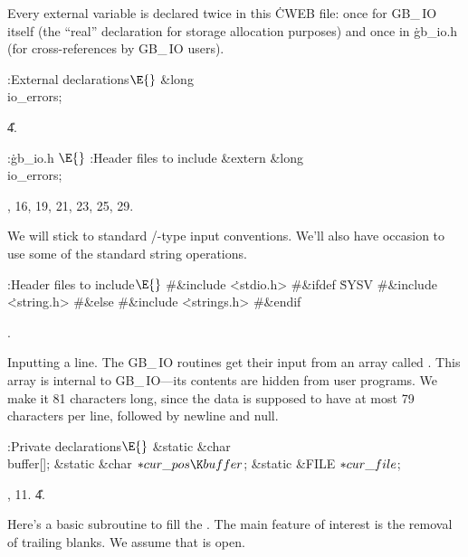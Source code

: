 Every external variable is declared twice in this \.{CWEB} file:
once for {\sc GB\_\,IO} itself (the ``real'' declaration for storage
allocation purposes) and once in \.{gb\_io.h} (for cross-references
by {\sc GB\_\,IO} users).

\Y\B\4:External declarations\X${}\E{}$\6
\&{long} \\{io\_errors};\par
\U4.\fi

\B{}:\.{gb\_io.h }\X${}\E{}$\6
:Header files to include\X\7
\&{extern} \&{long} \\{io\_errors};\par
{}, 16, 19, 21, 23, 25, 29.\fi

We will stick to standard \CEE/-type input conventions. We'll also have
occasion to use some of the standard string operations.

\Y\B\4:Header files to include\X${}\E{}$\6
\8\#\&{include} \.{<stdio.h>}\6
\8\#\&{ifdef} \.{SYSV}\6
\8\#\&{include} \.{<string.h>}\6
\8\#\&{else}\6
\8\#\&{include} \.{<strings.h>}\6
\8\#\&{endif}\par
{}.\fi

Inputting a line. The {\sc GB\_\,IO} routines get their input from
an array called . This array is internal to {\sc
GB\_\,IO}---its contents are hidden from user programs. We make it 81
characters long, since the data is supposed to have at most 79
characters per line, followed by newline and null.

\Y\B\4:Private declarations\X${}\E{}$\6
\&{static} \&{char} \\{buffer}[];\6
\&{static} \&{char} ${}{*}\\{cur\_pos}\K\\{buffer}{}$;\6
\&{static} \&{FILE} ${}{*}\\{cur\_file}{}$;\par
{}, 11.
\U4.\fi

Here's a basic subroutine to fill the . The main feature of
interest
is the removal of trailing blanks. We assume that  is open.

